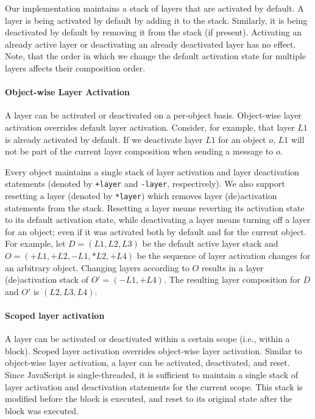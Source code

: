 \documentclass{sig-alternate}
\begin{document}
Our implementation maintains a stack of layers that are activated by default. A layer is being activated by default by adding it to the stack. Similarly, it is being deactivated by default by removing it from the stack (if present). Activating an already active layer or deactivating an already deactivated layer has no effect. Note, that the order in which we change the default activation state for multiple layers affects their composition order.

\paragraph{Object-wise Layer Activation}
A layer can be activated or deactivated on a per-object basis. Object-wise layer activation overrides default layer activation. Consider, for example, that layer $L1$ is already activated by default. If we deactivate layer $L1$ for an object $o$, $L1$ will not be part of the current layer composition when sending a message to $o$.

Every object maintains a single stack of layer activation and layer deactivation statements (denoted by \texttt{+layer} and \texttt{-layer}, respectively). We also support resetting a layer (denoted by \texttt{*layer}) which removes layer (de)activation statements from the stack. Resetting a layer means reverting its activation state to its default activation state, while deactivating a layer means turning off a layer for an object; even if it was activated both by default and for the current object. For example, let $D = (L1, L2, L3)$ be the default active layer stack and $O = (+L1, +L2, -L1, *L2, +L4)$ be the sequence of layer activation changes for an arbitrary object. Changing layers according to $O$ results in a layer (de)activation stack of $O' = (-L1, +L4)$. The resulting layer composition for $D$ and $O'$ is $(L2, L3, L4)$.

\paragraph{Scoped layer activation}
A layer can be activated or deactivated within a certain scope (i.e., within a block). Scoped layer activation overrides object-wise layer activation. Similar to object-wise layer activation, a layer can be activated, deactivated, and reset. Since JavaScript is single-threaded, it is sufficient to maintain a single stack of layer activation and deactivation statements for the current scope. This stack is modified before the block is executed, and reset to its original state after the block was executed.
\end{document}
